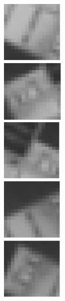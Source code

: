 \begin{figure}[H]
  \centering
  \begin{minipage}[c]{.3\textwidth}
  \centering
  \includegraphics[height=3cm]{pics/roi-3-2.png}
  \\ \vspace{.25cm}
  \includegraphics[height=3cm]{pics/roi-3-3.png}
  \\ \vspace{.25cm}
  \includegraphics[height=3cm]{pics/roi-3-4.png}
  \\ \vspace{.25cm}
  \includegraphics[height=3cm]{pics/roi-3-5.png}
  \\ \vspace{.25cm}
  \includegraphics[height=3cm]{pics/roi-3-1.png}
  \end{minipage}
  \begin{minipage}[c]{.3\textwidth}

\end{minipage}
\end{figure}
